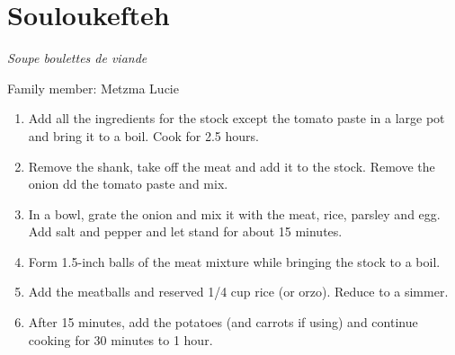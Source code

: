 \chapter{Souloukefteh}
\label{ch:souloukefteh}
\textit{Soupe boulettes de viande}

Family member: Metzma Lucie


\begin{enumerate}
    \item Add all the ingredients for the stock except the tomato paste in a large pot and bring it to a boil. Cook for 2.5 hours.
    \item Remove the shank, take off the meat and add it to the stock. Remove the onion dd the tomato paste and mix.
    \item In a bowl, grate the onion and mix it with the meat, rice, parsley and egg. Add salt and pepper and let stand for about 15 minutes.
    \item Form 1.5-inch balls of the meat mixture while bringing the stock to a boil.
    \item Add the meatballs and reserved 1/4 cup rice (or orzo). Reduce to a simmer.
    \item After 15 minutes, add the potatoes (and carrots if using) and continue cooking for 30 minutes to 1 hour.
\end{enumerate}
